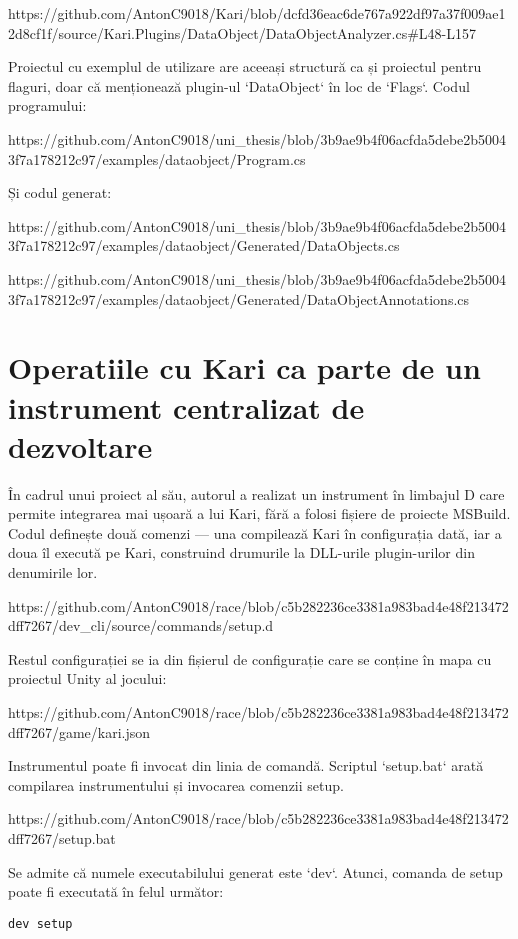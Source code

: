 \documentclass{report}
\begin{document}
https://github.com/AntonC9018/Kari/blob/dcfd36eac6de767a922df97a37f009ae12d8cf1f/source/Kari.Plugins/DataObject/DataObjectAnalyzer.cs#L48-L157

Proiectul cu exemplul de utilizare are aceeași structură ca și proiectul pentru flaguri, doar că menționează plugin-ul `DataObject` în loc de `Flags`.
Codul programului:

https://github.com/AntonC9018/uni_thesis/blob/3b9ae9b4f06acfda5debe2b50043f7a178212c97/examples/dataobject/Program.cs

Și codul generat:

https://github.com/AntonC9018/uni_thesis/blob/3b9ae9b4f06acfda5debe2b50043f7a178212c97/examples/dataobject/Generated/DataObjects.cs

https://github.com/AntonC9018/uni_thesis/blob/3b9ae9b4f06acfda5debe2b50043f7a178212c97/examples/dataobject/Generated/DataObjectAnnotations.cs

\section{Operatiile cu Kari ca parte de un instrument centralizat de dezvoltare}

În cadrul unui proiect al său, autorul a realizat un instrument în limbajul D care permite integrarea mai ușoară a lui Kari, fără a folosi fișiere de proiecte MSBuild.
Codul definește două comenzi — una compilează Kari în configurația dată, iar a doua îl execută pe Kari, construind drumurile la DLL-urile plugin-urilor din denumirile lor.

https://github.com/AntonC9018/race/blob/c5b282236ce3381a983bad4e48f213472dff7267/dev_cli/source/commands/setup.d

Restul configurației se ia din fișierul de configurație care se conține în mapa cu proiectul Unity al jocului:

https://github.com/AntonC9018/race/blob/c5b282236ce3381a983bad4e48f213472dff7267/game/kari.json

Instrumentul poate fi invocat din linia de comandă.
Scriptul `setup.bat` arată compilarea instrumentului și invocarea comenzii setup.

https://github.com/AntonC9018/race/blob/c5b282236ce3381a983bad4e48f213472dff7267/setup.bat

Se admite că numele executabilului generat este `dev`.
Atunci, comanda de setup poate fi executată în felul următor:

\begin{verbatim}
dev setup
\end{verbatim}
\end{document}
